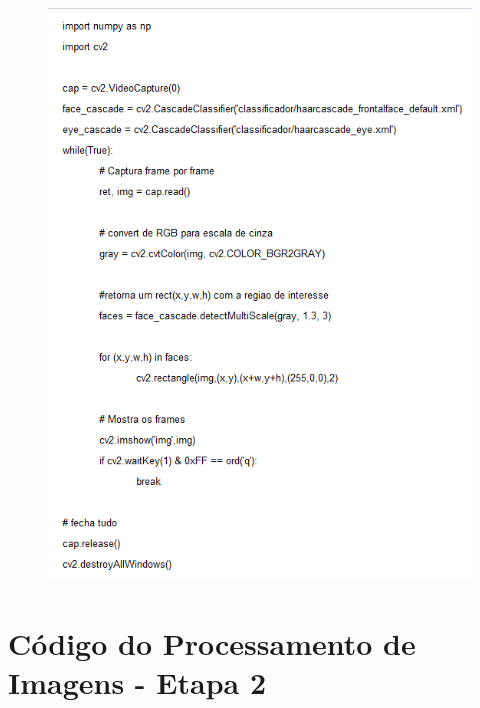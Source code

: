 \begin{apendicesenv}
\begin{figure}[H]
		\centering
			\includegraphics[scale=1.0]{figuras/img1.png}
		\label{img1}
\end{figure}

\chapter{Código do Processamento de Imagens - Etapa 2}


\end{apendicesenv}
